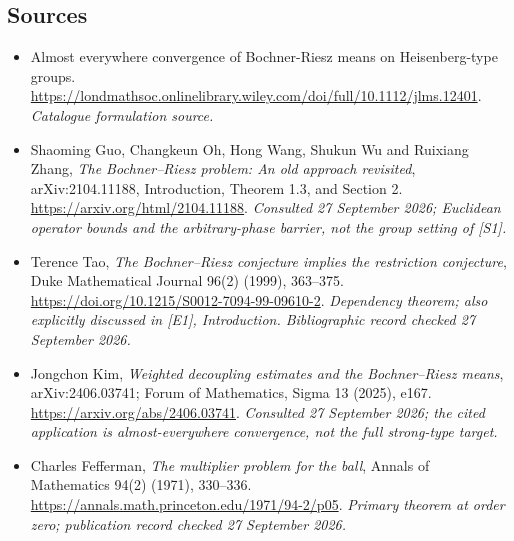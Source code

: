 \documentclass[11pt,a4paper]{article}
\numberwithin{equation}{section}
\begin{document}
\subsection{Sources}
\begin{itemize}\raggedright
\item[\textnormal{[S1]}]\hypertarget{source:30006774:1}{} Almost everywhere convergence of Bochner-Riesz means on Heisenberg-type groups.
\url{https://londmathsoc.onlinelibrary.wiley.com/doi/full/10.1112/jlms.12401}.
{\small\textit{Catalogue formulation source.}}
\item[\textnormal{[E1]}]\hypertarget{extra:30006774:1}{} Shaoming Guo, Changkeun
Oh, Hong Wang, Shukun Wu and Ruixiang Zhang, \emph{The Bochner--Riesz problem:
An old approach revisited}, arXiv:2104.11188, Introduction, Theorem 1.3,
and Section 2. \url{https://arxiv.org/html/2104.11188}.
{\small\textit{Consulted 27 September 2026; Euclidean operator bounds and
the arbitrary-phase barrier, not the group setting of [S1].}}
\item[\textnormal{[E2]}]\hypertarget{extra:30006774:2}{} Terence Tao,
\emph{The Bochner--Riesz conjecture implies the restriction conjecture},
Duke Mathematical Journal 96(2) (1999), 363--375.
\url{https://doi.org/10.1215/S0012-7094-99-09610-2}.
{\small\textit{Dependency theorem; also explicitly discussed in [E1],
Introduction. Bibliographic record checked 27 September 2026.}}
\item[\textnormal{[E3]}]\hypertarget{extra:30006774:3}{} Jongchon Kim,
\emph{Weighted decoupling estimates and the Bochner--Riesz means},
arXiv:2406.03741; Forum of Mathematics, Sigma 13 (2025), e167.
\url{https://arxiv.org/abs/2406.03741}.
{\small\textit{Consulted 27 September 2026; the cited application is
almost-everywhere convergence, not the full strong-type target.}}
\item[\textnormal{[E4]}]\hypertarget{extra:30006774:4}{} Charles Fefferman,
\emph{The multiplier problem for the ball}, Annals of Mathematics 94(2)
(1971), 330--336. \url{https://annals.math.princeton.edu/1971/94-2/p05}.
{\small\textit{Primary theorem at order zero; publication record checked
27 September 2026.}}
\end{itemize}
\end{document}
